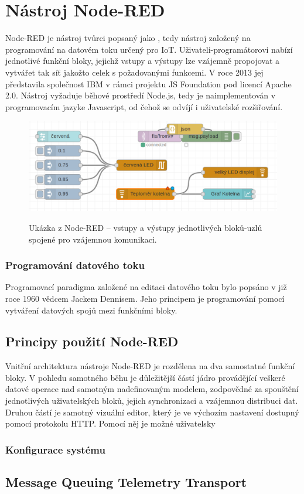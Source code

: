 \chapter{Nástroj Node-RED}
\label{ch:nastroj-node-red}

Node-RED je nástroj tvůrci popsaný jako , tedy nástroj založený na
programování na datovém toku určený pro IoT. Uživateli-programátorovi nabízí jednotlivé funkční bloky, jejichž vstupy a
výstupy lze vzájemně propojovat a vytvářet tak síť jakožto celek s požadovanými funkcemi. V roce 2013 jej představila
společnost IBM v rámci projektu JS Foundation pod licencí Apache 2.0. Nástroj vyžaduje běhové prostředí Node.js, tedy je
naimplementován v programovacím jazyke Javascript, od čehož se odvíjí i uživatelské rozšiřování.

\begin{figure}
    \includegraphics[width=\textwidth]{figures/node-red-example.png}
    \label{fig-node-red-example}
    \caption{Ukázka z Node-RED -- vstupy a výstupy jednotlivých bloků-uzlů spojené pro vzájemnou komunikaci.}
\end{figure}

\subsection{Programování datového toku}
Programovací paradigma založené na editaci datového toku bylo popsáno v již roce 1960 vědcem Jackem Dennisem. Jeho
principem je programování pomocí vytváření datových spojů mezi funkčními bloky.

\section{Principy použití Node-RED}

Vnitřní architektura nástroje Node-RED je rozdělena na dva samostatné funkční bloky. V pohledu samotného běhu je
důležitější částí jádro provádějící veškeré datové operace nad samotným nadefinovaným modelem, zodpovědné za spouštění
jednotlivých uživatelských bloků, jejich synchronizaci a vzájemnou distribuci dat. Druhou částí je samotný vizuální
editor, který je ve výchozím nastavení dostupný pomocí protokolu HTTP. Pomocí něj je možné uživatelsky 


\subsection{Konfigurace systému}


\section{Message Queuing Telemetry Transport}
